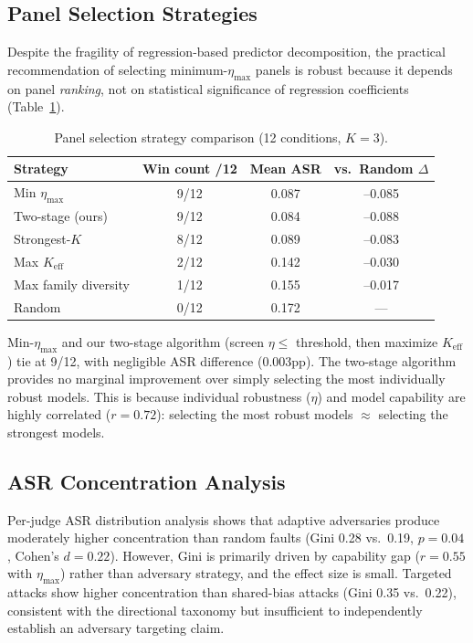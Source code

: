 \documentclass[11pt]{article}
\begin{document}
\subsection{Panel Selection Strategies}
\label{sec:selection}

Despite the fragility of regression-based predictor decomposition, the practical recommendation of selecting minimum-$\eta_{\max}$ panels is robust because it depends on panel \emph{ranking}, not on statistical significance of regression coefficients (Table~\ref{tab:selection}).

\begin{table}[h]
\centering
\caption{Panel selection strategy comparison (12 conditions, $K{=}3$).}
\label{tab:selection}
\small
\begin{tabular}{lccc}
\toprule
Strategy & Win count /12 & Mean ASR & vs.\ Random $\Delta$ \\
\midrule
Min $\eta_{\max}$ & 9/12 & 0.087 & --0.085 \\
Two-stage (ours) & 9/12 & 0.084 & --0.088 \\
Strongest-$K$ & 8/12 & 0.089 & --0.083 \\
Max $K_{\text{eff}}$ & 2/12 & 0.142 & --0.030 \\
Max family diversity & 1/12 & 0.155 & --0.017 \\
Random & 0/12 & 0.172 & --- \\
\bottomrule
\end{tabular}
\end{table}

Min-$\eta_{\max}$ and our two-stage algorithm (screen $\eta \leq$ threshold, then maximize $K_{\text{eff}}$) tie at 9/12, with negligible ASR difference (0.003pp). The two-stage algorithm provides no marginal improvement over simply selecting the most individually robust models. This is because individual robustness ($\eta$) and model capability are highly correlated ($r = 0.72$): selecting the most robust models $\approx$ selecting the strongest models.

\subsection{ASR Concentration Analysis}
\label{sec:concentration}

Per-judge ASR distribution analysis shows that adaptive adversaries produce moderately higher concentration than random faults (Gini 0.28 vs.\ 0.19, $p = 0.04$, Cohen's $d = 0.22$). However, Gini is primarily driven by capability gap ($r = 0.55$ with $\eta_{\max}$) rather than adversary strategy, and the effect size is small. Targeted attacks show higher concentration than shared-bias attacks (Gini 0.35 vs.\ 0.22), consistent with the directional taxonomy but insufficient to independently establish an adversary targeting claim.
\end{document}

